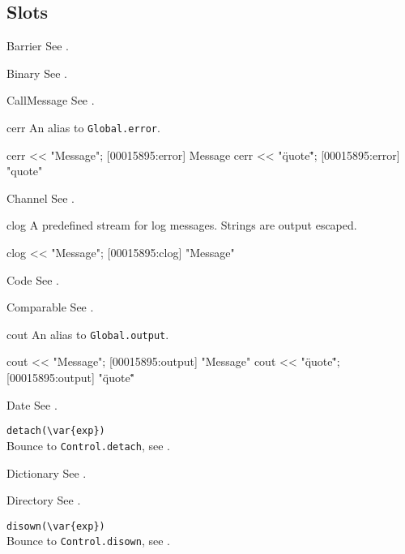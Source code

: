 \subsection{Slots}
\begin{urbiscriptapi}
\item[Barrier] See .
\item[Binary] See .
\item[CallMessage] See .

\item[cerr] An alias to \lstinline|Global.error|.
\begin{urbiscript}
cerr << "Message";
[00015895:error] Message
cerr << "\"quote\"";
[00015895:error] "quote"
\end{urbiscript}

\item[Channel] See .

\item[clog] A predefined stream for log messages.  Strings are output
  escaped.
\begin{urbiscript}
clog << "Message";
[00015895:clog] "Message"
\end{urbiscript}

\item[Code] See .
\item[Comparable] See .

\item[cout] An alias to \lstinline|Global.output|.
\begin{urbiscript}
cout << "Message";
[00015895:output] "Message"
cout << "\"quote\"";
[00015895:output] "\"quote\""
\end{urbiscript}

\item[Date] See .

\item \lstinline|detach(\var{exp})|\\
  Bounce to \lstinline|Control.detach|, see .

\item[Dictionary] See .
\item[Directory] See .

\item \lstinline|disown(\var{exp})|\\
  Bounce to \lstinline|Control.disown|, see .


\end{urbiscriptapi}
